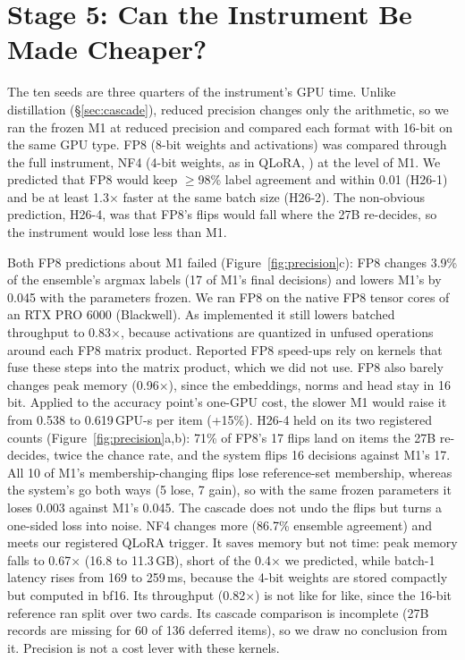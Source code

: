 \section{Stage 5: Can the Instrument Be Made Cheaper?}
\label{sec:precision}
\FigurePrecision

The ten seeds are three quarters of the instrument's GPU time.
Unlike distillation (\S\ref{sec:cascade}), reduced precision changes only the arithmetic, so we ran the frozen M1 at reduced precision and compared each format with 16-bit on the same GPU type.
FP8 (8-bit weights and activations) was compared through the full instrument, NF4 (4-bit weights, as in QLoRA, \citealp{dettmers2023qlora}) at the level of M1.
We predicted that FP8 would keep $\ge$98\% label agreement and \Stwo{} within 0.01 (H26-1) and be at least 1.3$\times$ faster at the same batch size (H26-2).
The non-obvious prediction, H26-4, was that FP8's flips would fall where the 27B re-decides, so the instrument would lose less than M1.

Both FP8 predictions about M1 failed (Figure~\ref{fig:precision}c): FP8 changes 3.9\% of the ensemble's argmax labels (17 of M1's final decisions) and lowers M1's \Stwo{} by 0.045 with the parameters frozen.
We ran FP8 on the native FP8 tensor cores of an RTX PRO 6000 (Blackwell). As implemented it still lowers batched throughput to 0.83$\times$, because activations are quantized in unfused operations around each FP8 matrix product. Reported FP8 speed-ups rely on kernels that fuse these steps into the matrix product, which we did not use. FP8 also barely changes peak memory (0.96$\times$), since the embeddings, norms and head stay in 16 bit.
Applied to the accuracy point's one-GPU cost, the slower M1 would raise it from 0.538 to 0.619\,\mbox{GPU-s} per item (+15\%).
H26-4 held on its two registered counts (Figure~\ref{fig:precision}a,b): 71\% of FP8's 17 flips land on items the 27B re-decides, twice the chance rate, and the system flips 16 decisions against M1's 17.
All 10 of M1's membership-changing flips lose reference-set membership, whereas the system's go both ways (5 lose, 7 gain), so with the same frozen parameters it loses 0.003 against M1's 0.045.
The cascade does not undo the flips but turns a one-sided loss into noise.
NF4 changes more (86.7\% ensemble agreement) and meets our registered QLoRA trigger.
It saves memory but not time: peak memory falls to 0.67$\times$ (16.8 to 11.3\,GB), short of the 0.4$\times$ we predicted, while batch-1 latency rises from 169 to 259\,ms, because the 4-bit weights are stored compactly but computed in bf16.
Its throughput (0.82$\times$) is not like for like, since the 16-bit reference ran split over two cards.
Its cascade comparison is incomplete (27B records are missing for 60 of 136 deferred items), so we draw no conclusion from it.
Precision is not a cost lever with these kernels.
